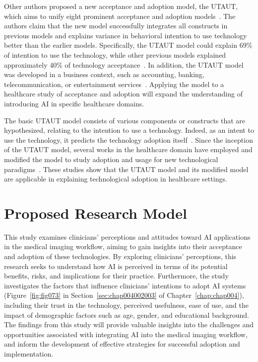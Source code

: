 Other authors proposed a new acceptance and adoption model, the \acf{UTAUT}, which aims to unify eight prominent acceptance and adoption models~\cite{info:doi/10.2196/27122}.
The authors claim that the new model successfully integrates all constructs in previous models and explains variance in behavioral intention to use technology better than the earlier models.
Specifically, the \ac{UTAUT} model could explain 69\% of intention to use the technology, while other previous models explained approximately 40\% of technology acceptance~\cite{CALISTO2022102922}.
In addition, the \ac{UTAUT} model was developed in a business context, such as accounting, banking, telecommunication, or entertainment services~\cite{KHALILZADEH2017460}.
Applying the model to a healthcare study of acceptance and adoption will expand the understanding of introducing AI in specific healthcare domains.

The basic \ac{UTAUT} model consists of various components or constructs that are hypothesized, relating to the intention to use a technology.
Indeed, as an intent to use the technology, it predicts the technology adoption itself~\cite{DEANGELI2020102412, HART201993}.
Since the inception of the \ac{UTAUT} model, several works in the healthcare domain have employed and modified the model to study adoption and usage for new technological paradigms~\cite{KHALILZADEH2017460}.
These studies show that the \ac{UTAUT} model and its modified model are applicable in explaining technological adoption in healthcare settings.

\section{Proposed Research Model}
\label{chap:app002002}

This study examines clinicians' perceptions and attitudes toward \ac{AI} applications in the medical imaging workflow, aiming to gain insights into their acceptance and adoption of these technologies.
By exploring clinicians' perceptions, this research seeks to understand how \ac{AI} is perceived in terms of its potential benefits, risks, and implications for their practice.
Furthermore, the study investigates the factors that influence clinicians' intentions to adopt \ac{AI} systems (Figure~\ref{fig:fig073} in Section~\ref{sec:chap004002003} of Chapter~\ref{chap:chap004}), including their trust in the technology, perceived usefulness, ease of use, and the impact of demographic factors such as age, gender, and educational background.
The findings from this study will provide valuable insights into the challenges and opportunities associated with integrating \ac{AI} into the medical imaging workflow, and inform the development of effective strategies for successful adoption and implementation.

